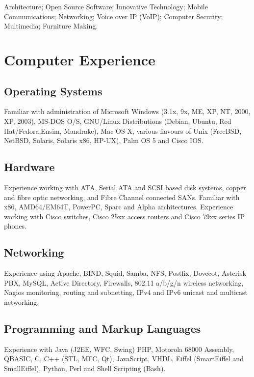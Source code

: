 \documentclass[a4paper, 11pt] {article}
\begin{document}
Architecture; Open Source Software; Innovative Technology; 
Mobile Communications;  Networking; Voice over IP (VoIP); 
Computer Security; Multimedia; Furniture Making.

\section*{Computer Experience}

\subsection*{Operating Systems}

Familiar with administration of Microsoft Windows (3.1x, 9x, 
ME, XP, NT, 2000, XP, 2003), MS-DOS O/S, GNU/Linux Distributions 
(Debian, Ubuntu, Red Hat/Fedora,Ensim, Mandrake), Mac OS X, various
flavours of Unix (FreeBSD, NetBSD, Solaris, Solaris x86, HP-UX), 
Palm OS 5 and Cisco IOS.

\subsection*{Hardware}

Experience working with ATA, Serial ATA and SCSI based disk systems, 
copper and fibre optic networking, and Fibre Channel connected SANs. 
Familiar with x86, AMD64/EM64T, PowerPC, Sparc and Alpha architectures. 
Experience working with Cisco switches, Cisco 25xx access routers and 
Cisco 79xx series IP phones.

\subsection*{Networking}

Experience using Apache, BIND, Squid, Samba, NFS, Postfix, Dovecot,
Asterisk PBX, MySQL, Active  Directory, Firewalls, 802.11 a/b/g/n wireless 
networking, Nagios monitoring, routing and subnetting, IPv4 and IPv6 
unicast and multicast networking.
 

\subsection*{Programming and Markup Languages}

Experience with Java (J2EE, WFC, Swing) PHP, Motorola 68000 Assembly, QBASIC,
C, C++ (STL, MFC, Qt), JavaScript, VHDL, Eiffel (SmartEiffel and 
SmallEiffel), Python, Perl and Shell Scripting (Bash). \\
\end{document}
